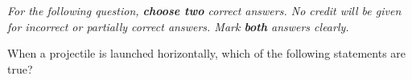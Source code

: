 \documentclass[10pt]{examdesign}
\begin{document}
\begin{multiplechoice} [title={Multiple Correct Multiple Choice},
	rearrange=no]
	\textit{For the following question, \textbf{choose two} correct answers.  No credit will be given for incorrect or partially correct answers.  Mark \textbf{both} answers clearly.} 



\begin{question}
	When a projectile is launched horizontally, which of the following statements are true?
\end{question}







\end{multiplechoice}
\end{document}
